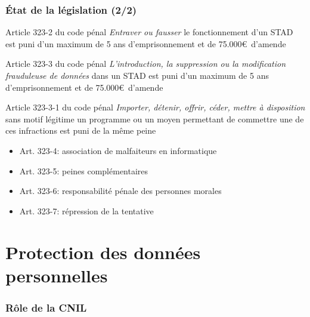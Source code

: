 \begin{reveals}
\begin{frame}
  \frametitle{État de la législation (2/2)}
  \vfill
  \begin{block}{Article 323-2 du code pénal}\small 
    \emph{Entraver ou fausser} le fonctionnement d'un STAD est puni
    d'un maximum de 5 ans d'emprisonnement et de 75.000\euro\ d'amende
  \end{block}
  \vfill
  \begin{block}{Article 323-3 du code pénal}\small 
    \emph{L'introduction, la suppression ou la modification
      frauduleuse de données} dans un STAD est puni d'un maximum de 5
    ans d'emprisonnement et de 75.000\euro\ d'amende
  \end{block}
  \vfill
  \begin{block}{Article 323-3-1 du code pénal}\small 
    \emph{Importer, détenir, offrir, céder, mettre à disposition} sans
    motif légitime un programme ou un moyen permettant de commettre
    une\! de\! ces\! infractions\! est\! puni\! de\! la même peine
  \end{block}
  \vfill
  \scriptsize
  \begin{itemize}
  \item Art. 323-4: association de malfaiteurs en informatique
  \item Art. 323-5: peines complémentaires
  \item Art. 323-6: responsabilité pénale des personnes morales
  \item Art. 323-7: répression de la tentative
  \end{itemize}
  \vfill
\end{frame}
\section{Protection des données personnelles}

\begin{frame}
  \frametitle{Rôle de la CNIL}


\end{frame}
\end{reveals}
